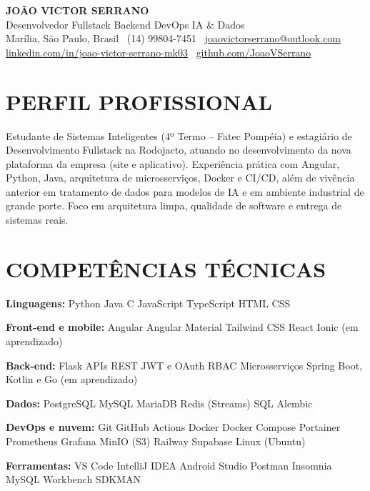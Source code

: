 \documentclass[9pt,a4paper]{extarticle}
\newcommand{\skill}[2]{\noindent\textbf{#1} #2\par}
\begin{document}
\begin{center}
  {\bfseries\color{navy}\fontsize{19}{22}\selectfont JOÃO VICTOR SERRANO}\\[2pt]
  {\color{gray}\fontsize{10}{12}\selectfont Desenvolvedor Fullstack \textperiodcentered{} Backend \textperiodcentered{} DevOps \textperiodcentered{} IA \& Dados}\\[3pt]
  {\color{gray}\fontsize{8.6}{10.5}\selectfont Marília, São Paulo, Brasil \textbar\ (14) 99804-7451 \textbar\ \href{mailto:joaovictorserrano@outlook.com}{joaovictorserrano@outlook.com}\\
  \href{https://www.linkedin.com/in/joao-victor-serrano-mk03}{linkedin.com/in/joao-victor-serrano-mk03} \textbar\ \href{https://github.com/JoaoVSerrano}{github.com/JoaoVSerrano}}
\end{center}
\section*{PERFIL PROFISSIONAL}
Estudante de Sistemas Inteligentes (4º Termo – Fatec Pompéia) e estagiário de Desenvolvimento Fullstack na Rodojacto, atuando no desenvolvimento da nova plataforma da empresa (site e aplicativo). Experiência prática com Angular, Python, Java, arquitetura de microsserviços, Docker e CI/CD, além de vivência anterior em tratamento de dados para modelos de IA e em ambiente industrial de grande porte. Foco em arquitetura limpa, qualidade de software e entrega de sistemas reais.

\section*{COMPETÊNCIAS TÉCNICAS}
\skill{Linguagens:}{Python \textperiodcentered{} Java \textperiodcentered{} C \textperiodcentered{} JavaScript \textperiodcentered{} TypeScript \textperiodcentered{} HTML \textperiodcentered{} CSS}
\skill{Front-end e mobile:}{Angular \textperiodcentered{} Angular Material \textperiodcentered{} Tailwind CSS \textperiodcentered{} React \textperiodcentered{} Ionic (em aprendizado)}
\skill{Back-end:}{Flask \textperiodcentered{} APIs REST \textperiodcentered{} JWT e OAuth \textperiodcentered{} RBAC \textperiodcentered{} Microsserviços \textperiodcentered{} Spring Boot, Kotlin e Go (em aprendizado)}
\skill{Dados:}{PostgreSQL \textperiodcentered{} MySQL \textperiodcentered{} MariaDB \textperiodcentered{} Redis (Streams) \textperiodcentered{} SQL \textperiodcentered{} Alembic}
\skill{DevOps e nuvem:}{Git \textperiodcentered{} GitHub Actions \textperiodcentered{} Docker \textperiodcentered{} Docker Compose \textperiodcentered{} Portainer \textperiodcentered{} Prometheus \textperiodcentered{} Grafana \textperiodcentered{} MinIO (S3) \textperiodcentered{} Railway \textperiodcentered{} Supabase \textperiodcentered{} Linux (Ubuntu)}
\skill{Ferramentas:}{VS Code \textperiodcentered{} IntelliJ IDEA \textperiodcentered{} Android Studio \textperiodcentered{} Postman \textperiodcentered{} Insomnia \textperiodcentered{} MySQL Workbench \textperiodcentered{} SDKMAN}
\end{document}
